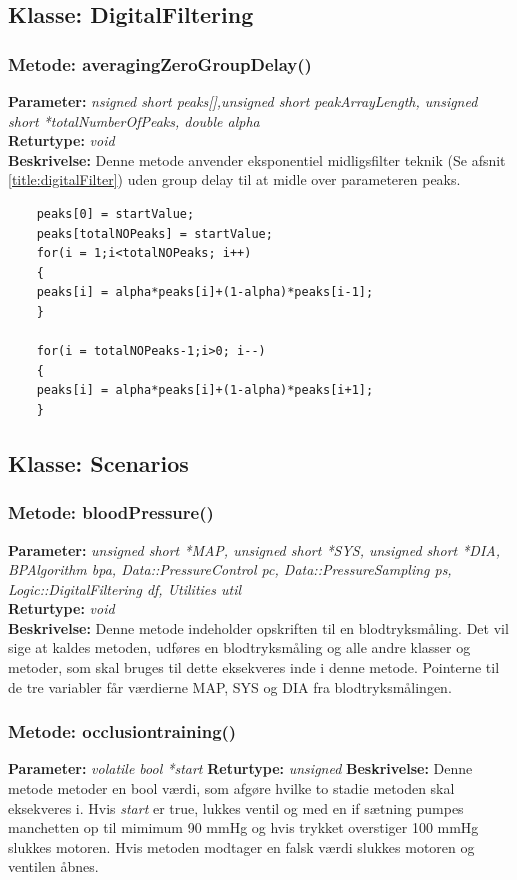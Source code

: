 \subsection{Klasse: DigitalFiltering}

\subsubsection{Metode: averagingZeroGroupDelay()}
\textbf{Parameter: } \textit{nsigned short peaks[],unsigned short peakArrayLength, unsigned short *totalNumberOfPeaks, double alpha}
\\ \textbf{Returtype: } \textit{void}
\\ \textbf{Beskrivelse: } Denne metode anvender eksponentiel midligsfilter teknik (Se afsnit \ref{title:digitalFilter}) uden group delay til at midle over parameteren peaks.
\begin{lstlisting}
	peaks[0] = startValue;
	peaks[totalNOPeaks] = startValue;
	for(i = 1;i<totalNOPeaks; i++)
	{
	peaks[i] = alpha*peaks[i]+(1-alpha)*peaks[i-1];
	}
	
	for(i = totalNOPeaks-1;i>0; i--)
	{
	peaks[i] = alpha*peaks[i]+(1-alpha)*peaks[i+1];
	}
\end{lstlisting}

\subsection{Klasse: Scenarios}

\subsubsection{Metode: bloodPressure()}
\textbf{Parameter: } \textit{unsigned short *MAP, unsigned short *SYS, unsigned short *DIA, BPAlgorithm bpa, Data::PressureControl pc, Data::PressureSampling ps, Logic::DigitalFiltering df, Utilities util}
\\ \textbf{Returtype: } \textit{void}
\\ \textbf{Beskrivelse: } Denne metode indeholder opskriften til en blodtryksmåling. Det vil sige at kaldes metoden, udføres en blodtryksmåling og alle andre klasser og metoder, som skal bruges til dette eksekveres inde i denne metode. Pointerne til de tre variabler får værdierne MAP, SYS og DIA fra blodtryksmålingen.

\subsubsection{Metode: occlusiontraining()}
\textbf{Parameter: } \textit{volatile bool *start}
\textbf{Returtype: } \textit{unsigned }
\textbf{Beskrivelse: } Denne metode metoder en bool værdi, som afgøre hvilke to stadie metoden skal eksekveres i. Hvis \textit{start} er true, lukkes ventil og med en if sætning pumpes manchetten op til mimimum 90 mmHg og hvis trykket overstiger 100 mmHg slukkes motoren. 
Hvis metoden modtager en falsk værdi slukkes motoren og ventilen åbnes. 

